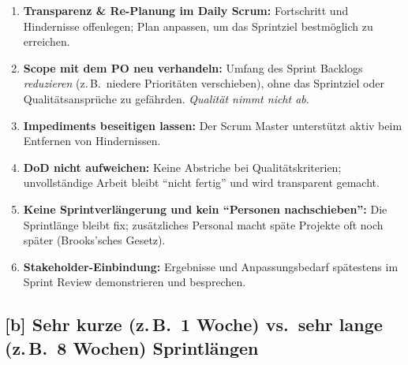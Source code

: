 \documentclass[12pt]{article}
\begin{document}
\begin{enumerate}

  \item \textbf{Transparenz \& Re-Planung im Daily Scrum:} Fortschritt und Hindernisse offenlegen; Plan anpassen, um das Sprintziel bestmöglich zu erreichen.
  
  \item \textbf{Scope mit dem PO neu verhandeln:} Umfang des Sprint Backlogs \emph{reduzieren} (z.\,B.\ niedere Prioritäten verschieben), ohne das Sprintziel oder Qualitätsansprüche zu gefährden. \emph{Qualität nimmt nicht ab}.

  \item \textbf{Impediments beseitigen lassen:} Der Scrum Master unterstützt aktiv beim Entfernen von Hindernissen.
  
  \item \textbf{DoD nicht aufweichen:} Keine Abstriche bei Qualitätskriterien; unvollständige Arbeit bleibt \enquote{nicht fertig} und wird transparent gemacht.
  
  \item \textbf{Keine Sprintverlängerung und kein \enquote{Personen nachschieben}:} Die Sprintlänge bleibt fix; zusätzliches Personal macht späte Projekte oft noch später (Brooks’sches Gesetz).
  
  \item \textbf{Stakeholder-Einbindung:} Ergebnisse und Anpassungsbedarf spätestens im Sprint Review demonstrieren und besprechen.

\end{enumerate}


\subsection*{[b] Sehr kurze (z.\,B.\ 1 Woche) vs.\ sehr lange (z.\,B.\ 8 Wochen) Sprintlängen}
\end{document}
